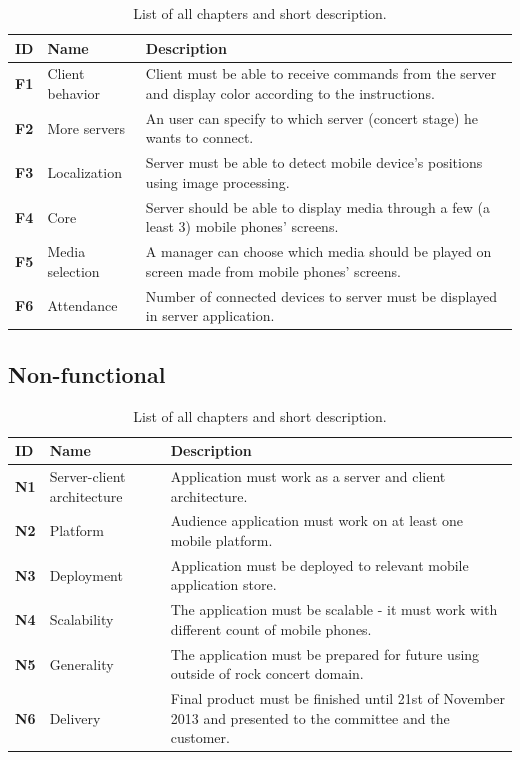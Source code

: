 \begin{table}[!h]\centering
\caption{List of all chapters and short description. }
\label{tab:req_func}
\def\arraystretch{1.3}
\begin{tabularx}{\textwidth}{llX}
\toprule[1mm]
\textbf{ID} & Name & Description\\
\midrule
\textbf{F1} & Client behavior & Client must be able to receive commands from the server and display color according to the instructions.\\
\textbf{F2} & More servers & An user can specify to which server (concert stage) he wants to connect.\\
\textbf{F3} & Localization & Server must be able to detect mobile device's positions using image processing.\\
\textbf{F4} & Core & Server should be able to display media through a few (a least 3) mobile phones' screens.\\
\textbf{F5} & Media selection & A manager can choose which media should be played on screen made from mobile phones' screens.\\
\textbf{F6} & Attendance & Number of connected devices to server must be displayed in server application. \\

\bottomrule[1mm]

\end{tabularx}
\end{table}

\subsection{Non-functional}

\begin{table}[!h]\centering
\caption{List of all chapters and short description. }
\label{tab:req_func}
\def\arraystretch{1.3}
\begin{tabularx}{\textwidth}{llX}
\toprule[1mm]
\textbf{ID} & Name & Description\\
\midrule
\textbf{N1} & Server-client architecture & Application must work as a server and client architecture.\\
\textbf{N2} & Platform & Audience application must work on at least one mobile platform.\\
\textbf{N3} & Deployment & Application must be deployed to relevant mobile application store.\\
\textbf{N4} & Scalability & The application must be scalable - it must work with different count of mobile phones.\\
\textbf{N5} & Generality & The application must be prepared for future using outside of rock concert domain.\\
\textbf{N6} & Delivery & Final product must be finished until 21st of November 2013 and presented to the committee and the customer.\\
\bottomrule[1mm]

\end{tabularx}
\end{table}
